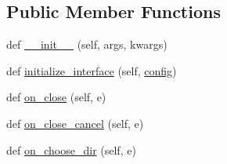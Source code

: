 \subsection*{Public Member Functions}
\begin{DoxyCompactItemize}
\item 
def \hyperlink{class_uni_dec_1_1unidec__modules_1_1miscwindows_1_1_save_figure_dialog_a580d320cf4c5575078f094f4cbfea0bc}{\+\_\+\+\_\+init\+\_\+\+\_\+} (self, args, kwargs)
\item 
def \hyperlink{class_uni_dec_1_1unidec__modules_1_1miscwindows_1_1_save_figure_dialog_a81afceaee587c4aa00df34b2af6e3923}{initialize\+\_\+interface} (self, \hyperlink{class_uni_dec_1_1unidec__modules_1_1miscwindows_1_1_save_figure_dialog_afeeb42cc44d011893f46da5fca95632f}{config})
\item 
def \hyperlink{class_uni_dec_1_1unidec__modules_1_1miscwindows_1_1_save_figure_dialog_aa77b3a69352f3e5848282c6b1e537620}{on\+\_\+close} (self, e)
\item 
def \hyperlink{class_uni_dec_1_1unidec__modules_1_1miscwindows_1_1_save_figure_dialog_a288b201f014dfe8e9c312a1b082f33d4}{on\+\_\+close\+\_\+cancel} (self, e)
\item 
def \hyperlink{class_uni_dec_1_1unidec__modules_1_1miscwindows_1_1_save_figure_dialog_adeaa1fcf678f2da9ad206d91915a5dbf}{on\+\_\+choose\+\_\+dir} (self, e)
\end{DoxyCompactItemize}
